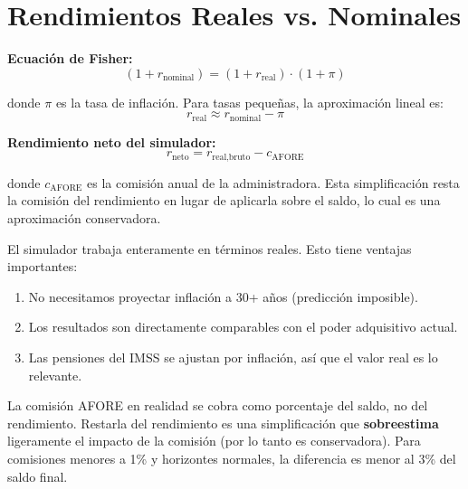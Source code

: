 \documentclass[11pt,a4paper]{report}
\theoremstyle{remark}
\begin{document}
\section{Rendimientos Reales vs. Nominales}

\begin{tcolorbox}[colback=blue!5!white, colframe=blue!75!black, title=\textbf{Definici\'on Formal}]
\textbf{Ecuaci\'on de Fisher:}
\begin{equation}
(1 + r_{\text{nominal}}) = (1 + r_{\text{real}}) \cdot (1 + \pi)
\label{eq:fisher}
\end{equation}

donde $\pi$ es la tasa de inflaci\'on. Para tasas peque\~nas, la aproximaci\'on lineal es:
\begin{equation}
r_{\text{real}} \approx r_{\text{nominal}} - \pi
\end{equation}

\textbf{Rendimiento neto del simulador:}
\begin{equation}
r_{\text{neto}} = r_{\text{real,bruto}} - c_{\text{AFORE}}
\label{eq:r_neto}
\end{equation}

donde $c_{\text{AFORE}}$ es la comisi\'on anual de la administradora. Esta simplificaci\'on resta la comisi\'on del rendimiento en lugar de aplicarla sobre el saldo, lo cual es una aproximaci\'on conservadora.
\end{tcolorbox}

\begin{tcolorbox}[colback=green!5!white, colframe=green!50!black, title=\textbf{Intuici\'on}]
El simulador trabaja enteramente en t\'erminos reales. Esto tiene ventajas importantes:
\begin{enumerate}
  \item No necesitamos proyectar inflaci\'on a 30+ a\~nos (predicci\'on imposible).
  \item Los resultados son directamente comparables con el poder adquisitivo actual.
  \item Las pensiones del IMSS se ajustan por inflaci\'on, as\'i que el valor real es lo relevante.
\end{enumerate}

La comisi\'on AFORE en realidad se cobra como porcentaje del saldo, no del rendimiento. Restarla del rendimiento es una simplificaci\'on que \textbf{sobreestima} ligeramente el impacto de la comisi\'on (por lo tanto es conservadora). Para comisiones menores a 1\% y horizontes normales, la diferencia es menor al 3\% del saldo final.
\end{tcolorbox}
\end{document}
